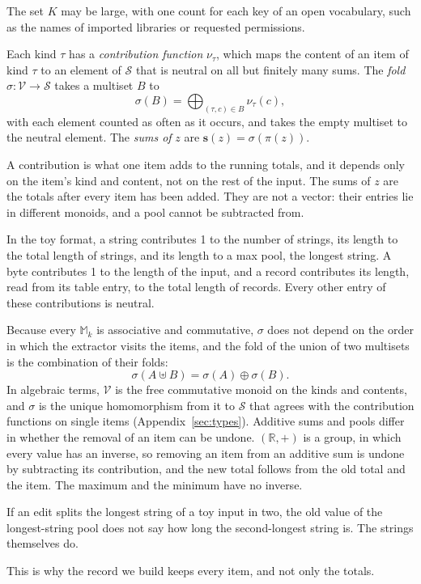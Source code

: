\noindent The set $K$ may be large, with one count for each key of an open vocabulary, such as the names of imported
libraries or requested permissions.

\label{def:fw:contributions}
{
Each kind $\tau$ has a \emph{contribution function} $\nu_\tau$, which maps the content of an item of kind $\tau$ to an
element of $\mathcal{S}$ that is neutral on all but finitely many sums. The \emph{fold}
$\sigma: \mathcal{V} \to \mathcal{S}$ takes a multiset $B$ to
\begin{equation}
  \label{eq:fw:fold}
  \sigma(B) = \bigoplus_{(\tau, c) \in B} \nu_\tau(c),
\end{equation}
with each element counted as often as it occurs, and takes the empty multiset to the neutral element. The \emph{sums
of} $z$ are $\mathbf{s}(z) = \sigma(\pi(z))$.
}

\noindent A contribution is what one item adds to the running totals, and it depends only on the item's kind and
content, not on the rest of the input. The sums of $z$ are the totals after every item has been added. They are not a
vector: their entries lie in different monoids, and a pool cannot be subtracted from.
\begin{runex}
In the toy format, a string contributes 1 to the number of strings, its length to the total length of strings, and its
length to a max pool, the longest string. A byte contributes 1 to the length of the input, and a record contributes
its length, read from its table entry, to the total length of records. Every other entry of these contributions is
neutral.
\end{runex}

Because every $\mathbb{M}_k$ is associative and commutative, $\sigma$ does not depend on the order in which the
extractor visits the items, and the fold of the union of two multisets is the combination of their folds:
\begin{equation}
  \label{eq:fw:homomorphism}
  \sigma(A \uplus B) = \sigma(A) \oplus \sigma(B).
\end{equation}
In algebraic terms, $\mathcal{V}$ is the free commutative monoid on the kinds and contents, and $\sigma$ is the unique
homomorphism from it to $\mathcal{S}$ that agrees with the contribution functions on single items
(Appendix~\ref{sec:types}). Additive sums and pools differ in whether the removal of an item can be undone.
$(\mathbb{R}, +)$ is a group, in which every value has an inverse, so removing an item from an additive sum is undone by subtracting its contribution, and the new total follows from the old total and the item.
The maximum and the minimum have no inverse.
\begin{runex}
If an edit splits the longest string of a toy input in two, the old value of the longest-string pool does not say how
long the second-longest string is. The strings themselves do.
\end{runex}
\noindent This is why the record we build keeps every item, and not only the totals.

